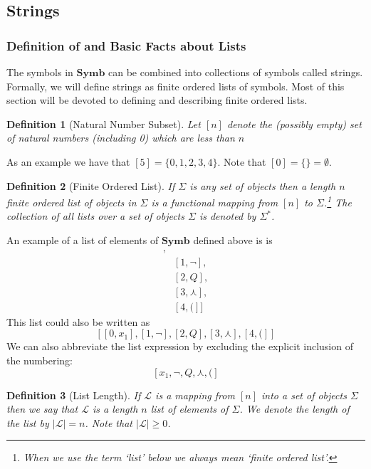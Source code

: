 \documentclass[12pt]{article}
\theoremstyle{break}
\newtheorem{definition}{Definition}[section]
\theoremstyle{break}
\theoremstyle{break}
\theoremstyle{break}
\newcommand{\mc}[1]{\mathcal{#1}}
\begin{document}
\subsection{Strings}
\subsubsection{Definition of and Basic Facts about Lists}
The symbols in $\textbf{Symb}$ can be combined into collections of symbols called strings.
Formally, we will define strings as finite ordered lists of symbols.
Most of this section will be devoted to defining and describing finite ordered lists.

\begin{definition}[Natural Number Subset]
Let $[n]$ denote the (possibly empty) set of natural numbers (including 0) which are less than $n$
\end{definition}

As an example we have that $[5] = \{0, 1, 2, 3, 4\}$.
Note that $[0] = \{\} = \emptyset$.

\begin{definition}[Finite Ordered List]
If $\Sigma$ is any set of objects then a length $n$ finite ordered list of objects in $\Sigma$ is a functional mapping from $[n]$ to $\Sigma$.\footnote{When we use the term `list' below we always mean `finite ordered list'.}  The collection of all lists over a set of objects $\Sigma$ is denoted by $\Sigma^*$.
\end{definition}


An example of a list of elements of $\textbf{Symb}$ defined above is is
\begin{align*}
[&[0, x_1],\\
&[1, \lnot],\\
&[2, Q],\\
&[3, \curlywedge],\\
&[4, (]]
\end{align*}
This list could also be written as
$$
[[0, x_1], [1, \lnot], [2, Q], [3, \curlywedge], [4, (]]
$$
We can also abbreviate the list expression by excluding the explicit inclusion of the numbering:
$$
[x_1, \lnot, Q, \curlywedge, (]
$$

\begin{definition}[List Length]
If $\mc{L}$ is a mapping from $[n]$ into a set of objects $\Sigma$ then we say that $\mc{L}$ is a length $n$ list of elements of $\Sigma$.
We denote the length of the list by $|\mc{L}| = n$.
Note that $|\mc{L}| \ge 0$.
\end{definition}
\end{document}
